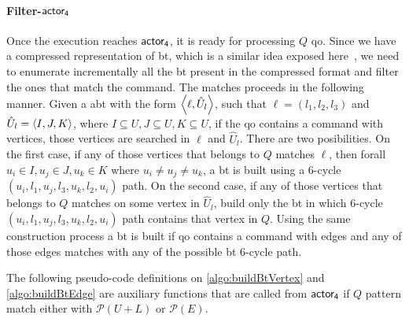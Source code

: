 \paragraph{Filter-$\mathsf{actor_4}$} Once the execution reaches $\mathsf{actor_4}$, it is ready for processing $Q$ \acrlong{qo}. 
Since we have a compressed representation of \acrshort{bt}, which is a similar idea exposed here~\cite{Lai}, we need to enumerate incrementally all the \acrshort{bt} present in the compressed format and filter the ones that match the command.
The matches proceeds in the following manner. Given a \acrshort{abt} with the form $\left\langle \ell, \hat{U}_l \right\rangle$, such that $\ell = (l_1,l_2,l_3)$ and $\hat{U}_l = \left\langle I,J,K \right\rangle$, where $I \subseteq U, J \subseteq U, K \subseteq U$, if the \acrshort{qo} contains a command with vertices, those vertices are searched in $\ell$ and $\hat{U}_l$. 
There are two posibilities. On the first case, if any of those vertices that belongs to $Q$ matches $\ell$, then forall $u_i \in I, u_j \in J, u_k \in K$ where $ u_i \neq u_j \neq u_k$, a \acrshort{bt} is built using a 6-cycle $(u_i, l_1, u_j, l_3, u_k, l_2, u_i)$ path.
On the second case, if any of those vertices that belongs to $Q$ matches on some vertex in $\hat{U}_l$, build only the \acrshort{bt} in which 6-cycle $(u_i, l_1, u_j, l_3, u_k, l_2, u_i)$ path contains that vertex in $Q$.
Using the same construction process a \acrshort{bt} is built if \acrshort{qo} contains a command with edges and any of those edges matches with any of the possible \acrshort{bt} 6-cycle path.

The following pseudo-code definitions on \autoref{algo:buildBtVertex} and \autoref{algo:buildBtEdge} are auxiliary functions that are called
from $\mathsf{actor_4}$ if $Q$ pattern match either with $\mathcal{P}(U + L)$ or $\mathcal{P}(E)$.

